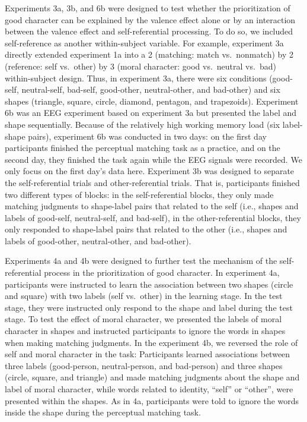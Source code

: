 \documentclass[
  man]{apa6}
\begin{document}
Experiments 3a, 3b, and 6b were designed to test whether the prioritization of good character can be explained by the valence effect alone or by an interaction between the valence effect and self-referential processing. To do so, we included self-reference as another within-subject variable. For example, experiment 3a directly extended experiment 1a into a 2 (matching: match vs.~nonmatch) by 2 (reference: self vs.~other) by 3 (moral character: good vs.~neutral vs.~bad) within-subject design. Thus, in experiment 3a, there were six conditions (good-self, neutral-self, bad-self, good-other, neutral-other, and bad-other) and six shapes (triangle, square, circle, diamond, pentagon, and trapezoids). Experiment 6b was an EEG experiment based on experiment 3a but presented the label and shape sequentially. Because of the relatively high working memory load (six label-shape pairs), experiment 6b was conducted in two days: on the first day participants finished the perceptual matching task as a practice, and on the second day, they finished the task again while the EEG signals were recorded. We only focus on the first day's data here. Experiment 3b was designed to separate the self-referential trials and other-referential trials. That is, participants finished two different types of blocks: in the self-referential blocks, they only made matching judgments to shape-label pairs that related to the self (i.e., shapes and labels of good-self, neutral-self, and bad-self), in the other-referential blocks, they only responded to shape-label pairs that related to the other (i.e., shapes and labels of good-other, neutral-other, and bad-other).

Experiments 4a and 4b were designed to further test the mechanism of the self-referential process in the prioritization of good character. In experiment 4a, participants were instructed to learn the association between two shapes (circle and square) with two labels (self vs.~other) in the learning stage. In the test stage, they were instructed only respond to the shape and label during the test stage. To test the effect of moral character, we presented the labels of moral character in shapes and instructed participants to ignore the words in shapes when making matching judgments. In the experiment 4b, we reversed the role of self and moral character in the task: Participants learned associations between three labels (good-person, neutral-person, and bad-person) and three shapes (circle, square, and triangle) and made matching judgments about the shape and label of moral character, while words related to identity, ``self'' or ``other'', were presented within the shapes. As in 4a, participants were told to ignore the words inside the shape during the perceptual matching task.
\end{document}
